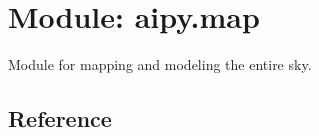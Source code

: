 \section{Module: aipy.map}
Module for mapping and modeling the entire sky.

\subsection{Reference}


